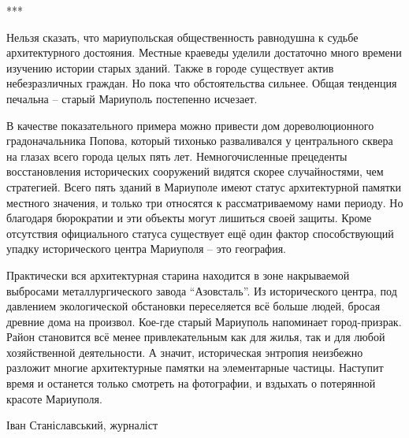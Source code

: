  
 
 
 
 

***

Нельзя сказать, что мариупольская общественность равнодушна к судьбе
архитектурного достояния. Местные краеведы уделили достаточно много времени
изучению истории старых зданий. Также в городе существует актив небезразличных
граждан. Но пока что обстоятельства сильнее. Общая тенденция печальна – старый
Мариуполь постепенно исчезает.

В качестве показательного примера можно привести дом дореволюционного
градоначальника Попова, который тихонько разваливался у центрального сквера на
глазах всего города целых пять лет. Немногочисленные прецеденты восстановления
исторических сооружений видятся скорее случайностями, чем стратегией. Всего
пять зданий в Мариуполе имеют статус архитектурной памятки местного значения, и
только три относятся к рассматриваемому нами периоду. Но благодаря бюрократии и
эти объекты могут лишиться своей защиты. Кроме отсутствия официального статуса
существует ещё один фактор способствующий упадку исторического центра Мариуполя
– это география.

Практически вся архитектурная старина находится в зоне накрываемой выбросами
металлургического завода \enquote{Азовсталь}. Из исторического центра, под давлением
экологической обстановки переселяется всё больше людей, бросая древние дома на
произвол. Кое-где старый Мариуполь напоминает город-призрак. Район становится
всё менее привлекательным как для жилья, так и для любой хозяйственной
деятельности. А значит, историческая энтропия неизбежно разложит многие
архитектурные памятки на элементарные частицы. Наступит время и останется
только смотреть на фотографии, и вздыхать о потерянной красоте Мариуполя.

Іван Станіславський, журналіст

